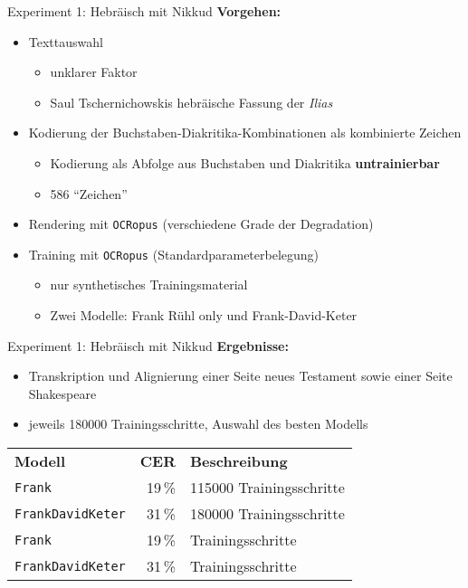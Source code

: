 \documentclass{bbawslides}
\begin{document}
\begin{bbawslide}{Experiment 1: Hebräisch mit Nikkud}
  \vspace*{7mm}%
  \centerslidestrue%
  \textbf{Vorgehen:}
  \begin{itemize}
    \item Texttauswahl
    \begin{itemize}\small
      \item unklarer Faktor
      \item Saul Tschernichowskis hebräische Fassung der \emph{Ilias}
    \end{itemize}
    \item Kodierung der Buchstaben-Diakritika-Kombinationen als kombinierte Zeichen
    \begin{itemize}\small
      \item Kodierung als Abfolge aus Buchstaben und Diakritika \textbf{untrainierbar}
      \item 586 \enquote{Zeichen}
    \end{itemize}
    \item Rendering mit \texttt{OCRopus} (verschiedene Grade der Degradation)
    \item Training mit \texttt{OCRopus} (Standardparameterbelegung)
    \begin{itemize}\small
      \item nur synthetisches Trainingsmaterial
      \item Zwei Modelle: Frank Rühl only und Frank-David-Keter
    \end{itemize}
  \end{itemize}
\end{bbawslide}

\begin{bbawslide}{Experiment 1: Hebräisch mit Nikkud}
  \vspace*{7mm}%
  \centerslidestrue%
  \textbf{Ergebnisse:}
  \begin{itemize}
    \item Transkription und Alignierung einer Seite neues Testament sowie einer Seite Shakespeare
    \item jeweils 180000 Trainingsschritte, Auswahl des besten Modells
  \end{itemize}
  \begin{tabular}{lrp{}}
    \textbf{Modell} & \textbf{CER} & \textbf{Beschreibung}\\
    \texttt{Frank} & 19\,\% & 115000 Trainingsschritte\\
    \texttt{FrankDavidKeter} & 31\,\% & 180000 Trainingsschritte \\
    \hline
    \texttt{Frank} & 19\,\% & Trainingsschritte\\
    \texttt{FrankDavidKeter} & 31\,\% & Trainingsschritte \\
  \end{tabular}
\end{bbawslide}
\end{document}
